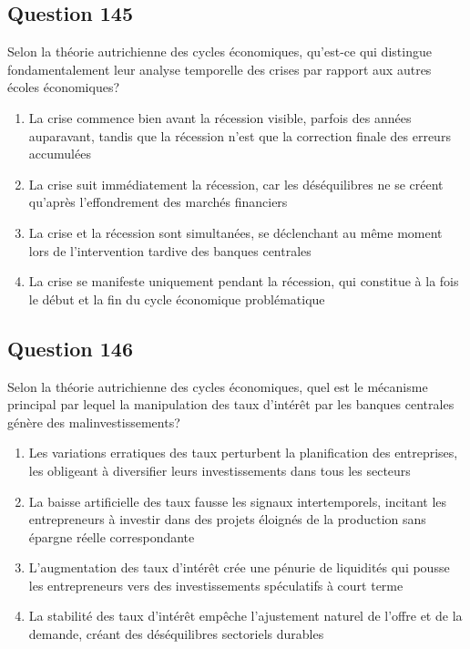 \documentclass[12pt,a4paper]{article}
\begin{document}
\bigskip


\subsection*{Question 145}
Selon la théorie autrichienne des cycles économiques, qu'est-ce qui distingue fondamentalement leur analyse temporelle des crises par rapport aux autres écoles économiques?

\begin{enumerate}[label=\Alph*., leftmargin=*]
\item La crise commence bien avant la récession visible, parfois des années auparavant, tandis que la récession n'est que la correction finale des erreurs accumulées
\item La crise suit immédiatement la récession, car les déséquilibres ne se créent qu'après l'effondrement des marchés financiers
\item La crise et la récession sont simultanées, se déclenchant au même moment lors de l'intervention tardive des banques centrales
\item La crise se manifeste uniquement pendant la récession, qui constitue à la fois le début et la fin du cycle économique problématique
\end{enumerate}

\bigskip


\subsection*{Question 146}
Selon la théorie autrichienne des cycles économiques, quel est le mécanisme principal par lequel la manipulation des taux d'intérêt par les banques centrales génère des malinvestissements?

\begin{enumerate}[label=\Alph*., leftmargin=*]
\item Les variations erratiques des taux perturbent la planification des entreprises, les obligeant à diversifier leurs investissements dans tous les secteurs
\item La baisse artificielle des taux fausse les signaux intertemporels, incitant les entrepreneurs à investir dans des projets éloignés de la production sans épargne réelle correspondante
\item L'augmentation des taux d'intérêt crée une pénurie de liquidités qui pousse les entrepreneurs vers des investissements spéculatifs à court terme
\item La stabilité des taux d'intérêt empêche l'ajustement naturel de l'offre et de la demande, créant des déséquilibres sectoriels durables
\end{enumerate}
\end{document}
